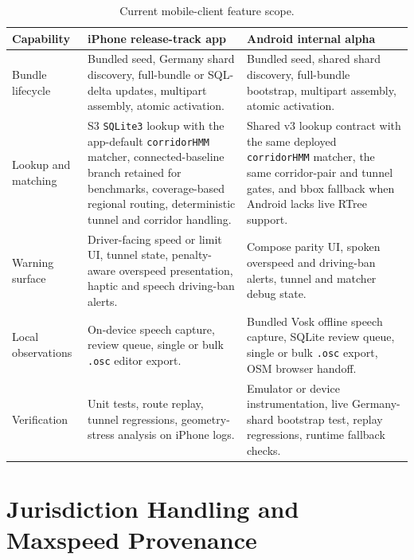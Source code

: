 \documentclass{article}
\begin{document}
\begin{table}[!htbp]
\centering
\scriptsize
\caption{Current mobile-client feature scope.}
\label{tab:client_features}
\begin{tabular}{p{2.4cm}p{4.8cm}p{4.8cm}}
\toprule
Capability & iPhone release-track app & Android internal alpha \\
\midrule
Bundle lifecycle & Bundled seed, Germany shard discovery, full-bundle or SQL-delta updates, multipart assembly, atomic activation. & Bundled seed, shared shard discovery, full-bundle bootstrap, multipart assembly, atomic activation. \\
Lookup and matching & S3 \texttt{SQLite3} lookup with the app-default \texttt{corridorHMM} matcher, connected-baseline branch retained for benchmarks, coverage-based regional routing, deterministic tunnel and corridor handling. & Shared v3 lookup contract with the same deployed \texttt{corridorHMM} matcher, the same corridor-pair and tunnel gates, and bbox fallback when Android lacks live RTree support. \\
Warning surface & Driver-facing speed or limit UI, tunnel state, penalty-aware overspeed presentation, haptic and speech driving-ban alerts. & Compose parity UI, spoken overspeed and driving-ban alerts, tunnel and matcher debug state. \\
Local observations & On-device speech capture, review queue, single or bulk \texttt{.osc} editor export. & Bundled Vosk offline speech capture, SQLite review queue, single or bulk \texttt{.osc} export, OSM browser handoff. \\
Verification & Unit tests, route replay, tunnel regressions, geometry-stress analysis on iPhone logs. & Emulator or device instrumentation, live Germany-shard bootstrap test, replay regressions, runtime fallback checks. \\
\bottomrule
\end{tabular}
\end{table}

\section{Jurisdiction Handling and Maxspeed Provenance}
\end{document}
